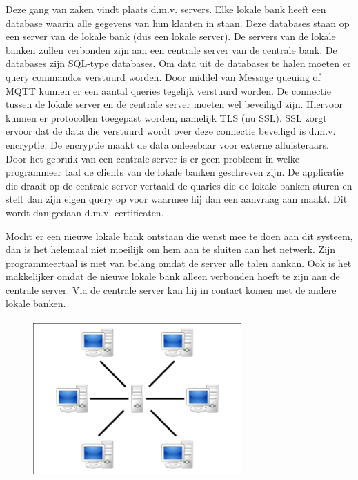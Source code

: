 \documentclass{article}
\begin{document}
Deze gang van zaken vindt plaats d.m.v. servers.
Elke lokale bank heeft een database waarin alle gegevens van hun klanten in staan.
Deze databases staan op een server van de lokale bank (dus een lokale server).
De servers van de lokale banken zullen verbonden zijn aan een centrale server
van de centrale bank.
De databases zijn SQL-type databases.
Om data uit de databases te halen moeten er query commandos verstuurd worden.
Door middel van Message queuing of MQTT kunnen er een aantal queries tegelijk verstuurd worden.
De connectie tussen de lokale server en de centrale server moeten wel beveiligd zijn.
Hiervoor kunnen er protocollen toegepast worden, namelijk TLS (nu SSL).
SSL zorgt ervoor dat de data die verstuurd wordt over deze connectie beveiligd is
d.m.v. encryptie.
De encryptie maakt de data onleesbaar voor externe afluisteraars.
Door het gebruik van een centrale server is er geen probleem in welke
programmeer taal de clients van de lokale banken geschreven zijn.
De applicatie die draait op de centrale server vertaald de quaries
die de lokale banken sturen en stelt dan zijn eigen query op voor
waarmee hij dan een aanvraag aan maakt.
Dit wordt dan gedaan d.m.v. certificaten. 

Mocht er een nieuwe lokale bank ontstaan die wenst mee te doen aan dit systeem,
dan is het helemaal niet moeilijk om hem aan te sluiten aan het netwerk.
Zijn programmeertaal is niet van belang omdat de server alle talen aankan.
Ook is het makkelijker omdat de nieuwe lokale bank alleen verbonden
hoeft te zijn aan de centrale server.
Via de centrale server kan hij in contact komen met de andere lokale banken.

\vspace{5mm}

\begin{figure}[h]
\includegraphics[height=6cm, width=8cm]{centralserver.png}
\centering
\end{figure}
\end{document}

